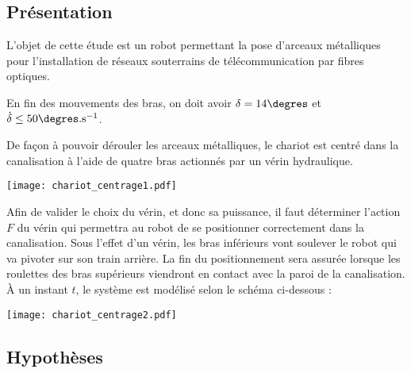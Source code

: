 \ifprof
\else
\begin{multicols}{2}
\fi

\subsection*{Présentation}
\ifprof
\else
L'objet de cette étude est un robot permettant la pose d'arceaux métalliques pour l'installation de réseaux souterrains de télécommunication par fibres optiques.
\fi
\begin{obj}
En fin des mouvements des bras, on doit avoir $\delta=14\degres$ et $\dot{\delta}\leq 50\degres.\text{s}^{-1}$.
\end{obj}
%
\ifprof
\else

De façon à pouvoir dérouler les arceaux métalliques, le chariot est centré dans la canalisation à l'aide de quatre bras actionnés par un vérin hydraulique.

\begin{center}
\texttt{[image: chariot\_centrage1.pdf]}
\end{center}


Afin de valider le choix du vérin, et donc sa puissance, il faut déterminer l'action $F$ du vérin
qui permettra au robot de se positionner correctement dans la canalisation.
Sous l'effet
d'un vérin, les bras inférieurs vont soulever le
robot qui va pivoter sur son train arrière. La fin
du positionnement sera assurée lorsque les
roulettes des bras supérieurs viendront en
contact avec la paroi de la canalisation.
À un instant $t$, le système est modélisé selon le schéma ci-dessous :


\begin{center}
\texttt{[image: chariot\_centrage2.pdf]}
\end{center}
\fi

\subsection*{Hypothèses}
\ifprof
\else


\end{multicols}
